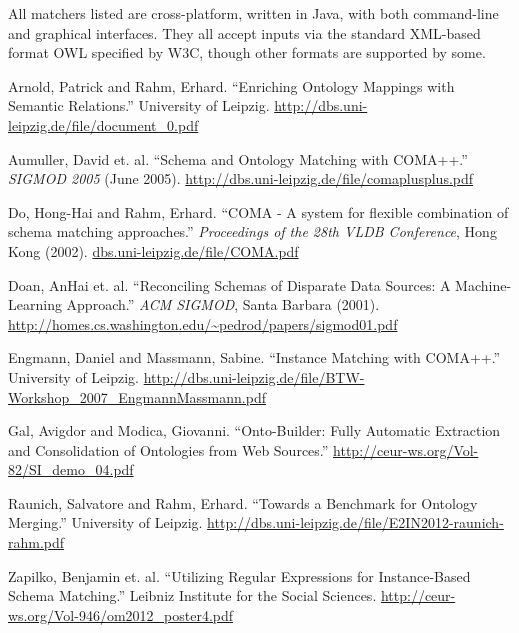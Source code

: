 \documentclass{datamade}
\theoremstyle{definition}
\theoremstyle{remark}
\begin{document}
All matchers listed are cross-platform, written in Java, with both command-line and graphical interfaces. They all accept inputs via the standard XML-based format OWL specified by W3C, though other formats are supported by some. 

\begin{thebibliography}{9}
	Arnold, Patrick and Rahm, Erhard.
	``Enriching Ontology Mappings with Semantic Relations.''
	University of Leipzig.
	\url{http://dbs.uni-leipzig.de/file/document_0.pdf}	

	Aumuller, David et. al.
	``Schema and Ontology Matching with COMA++.''
	\emph{SIGMOD 2005} (June 2005). 
	\url{http://dbs.uni-leipzig.de/file/comaplusplus.pdf}
	
	Do, Hong-Hai and Rahm, Erhard.
	``COMA - A system for flexible combination of schema matching approaches.''
	\emph{Proceedings of the 28th VLDB Conference}, Hong Kong (2002).
	\url{dbs.uni-leipzig.de/file/COMA.pdf}
	
	Doan, AnHai et. al.
	``Reconciling Schemas of Disparate Data Sources: A Machine-Learning Approach.''
	\emph{ACM SIGMOD}, Santa Barbara (2001).
	\url{http://homes.cs.washington.edu/~pedrod/papers/sigmod01.pdf}
	
	Engmann, Daniel and Massmann, Sabine.
	``Instance Matching with COMA++.''
	University of Leipzig.
	\url{ http://dbs.uni-leipzig.de/file/BTW-Workshop_2007_EngmannMassmann.pdf}
	
	Gal, Avigdor and Modica, Giovanni.
	``Onto-Builder: Fully Automatic Extraction and Consolidation of Ontologies from Web Sources.''
	\url{http://ceur-ws.org/Vol-82/SI_demo_04.pdf}

	Raunich, Salvatore and Rahm, Erhard.
	``Towards a Benchmark for Ontology Merging.''
	University of Leipzig.
	\url{http://dbs.uni-leipzig.de/file/E2IN2012-raunich-rahm.pdf}

	Zapilko, Benjamin et. al. 
	``Utilizing Regular Expressions for Instance-Based Schema Matching.''
	Leibniz Institute for the Social Sciences.
	\url{http://ceur-ws.org/Vol-946/om2012_poster4.pdf}
\end{thebibliography}
\end{document}
